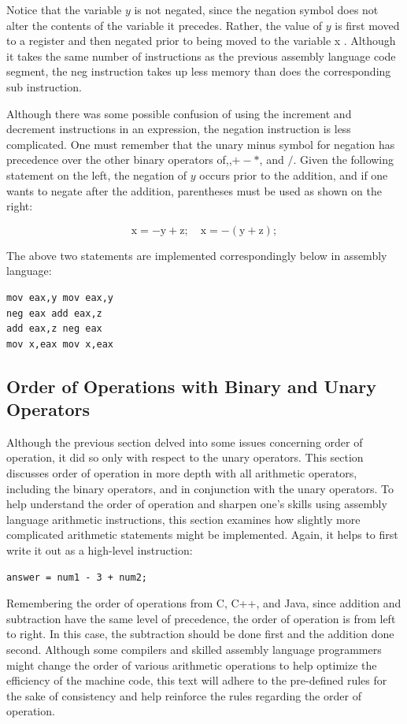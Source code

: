 \documentclass[10pt]{article}
\begin{document}
Notice that the variable $y$ is not negated, since the negation symbol does not alter the contents of the variable it precedes. Rather, the value of $y$ is first moved to a register and then negated prior to being moved to the variable x . Although it takes the same number of instructions as the previous assembly language code segment, the neg instruction takes up less memory than does the corresponding sub instruction.

Although there was some possible confusion of using the increment and decrement instructions in an expression, the negation instruction is less complicated. One must remember that the unary minus symbol for negation has precedence over the other binary operators of,,$+- *$, and $/$. Given the following statement on the left, the negation of $y$ occurs prior to the addition, and if one wants to negate after the addition, parentheses must be used as shown on the right:

$$
\mathrm{x}=-\mathrm{y}+\mathrm{z} ; \quad \mathrm{x}=-(\mathrm{y}+\mathrm{z}) ;
$$

The above two statements are implemented correspondingly below in assembly language:

\begin{verbatim}
mov eax,y mov eax,y
neg eax add eax,z
add eax,z neg eax
mov x,eax mov x,eax
\end{verbatim}

\subsection*{Order of Operations with Binary and Unary Operators}
Although the previous section delved into some issues concerning order of operation, it did so only with respect to the unary operators. This section discusses order of operation in more depth with all arithmetic operators, including the binary operators, and in conjunction with the unary operators. To help understand the order of operation and sharpen one's skills using assembly language arithmetic instructions, this section examines how slightly more complicated arithmetic statements might be implemented. Again, it helps to first write it out as a high-level instruction:

\begin{verbatim}
answer = num1 - 3 + num2;
\end{verbatim}

Remembering the order of operations from C, C++, and Java, since addition and subtraction have the same level of precedence, the order of operation is from left to right. In this case, the subtraction should be done first and the addition done second. Although some compilers and skilled assembly language programmers might change the order of various arithmetic operations to help optimize the efficiency of the machine code, this text will adhere to the pre-defined rules for the sake of consistency and help reinforce the rules regarding the order of operation.
\end{document}
